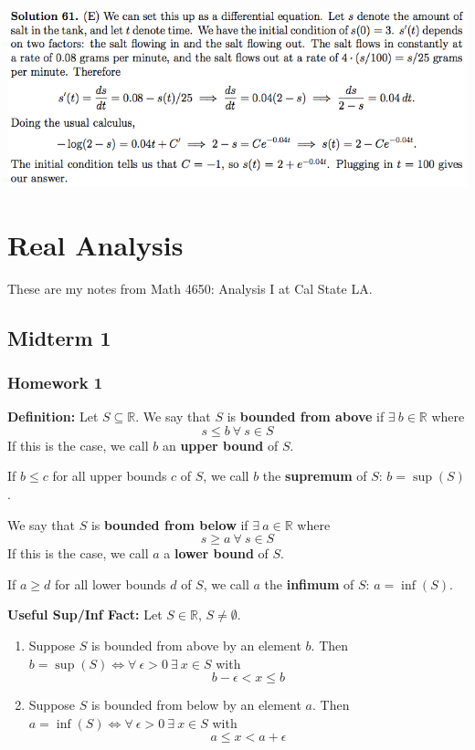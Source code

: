 \documentclass{article}
\begin{document}
\includegraphics[scale=0.65]{1268_61s}

\pagebreak

\section{Real Analysis}

These are my notes from Math 4650: Analysis I at Cal State LA.


\subsection{Midterm 1}

\subsubsection{Homework 1}

\textbf{Definition:} Let \(S \subseteq \mathbb{R}\). We say that \(S\) is \textbf{bounded from above} if \(\exists \ b \in \mathbb{R}\) where \[s \leq b \ \forall \ s \in S\]If this is the case, we call \(b\) an \textbf{upper bound} of \(S\).

If \(b \leq c \) for all upper bounds \(c\) of \(S\), we call \(b\) the \textbf{supremum} of \(S\): \(b = \sup(S)\).

We say that \(S\) is \textbf{bounded from below} if \(\exists \ a \in \mathbb{R}\) where \[s \geq a \ \forall \ s \in S\]If this is the case, we call \(a\) a \textbf{lower bound} of \(S\).

If \(a \geq d \) for all lower bounds \(d\) of \(S\), we call \(a\) the \textbf{infimum} of \(S\): \(a = \inf(S)\).

\textbf{Useful Sup/Inf Fact:} Let \(S \in \mathbb{R}\), \(S \neq \emptyset\). 

\begin{enumerate}[(1)]

\item Suppose \(S\) is bounded from above by an element \(b\). Then \(b = \sup(S) \iff \forall \ \epsilon >0 \ \exists \ x \in S\) with \[b - \epsilon < x \leq b\]

\item Suppose \(S\) is bounded from below by an element \(a\). Then \(a = \inf(S) \iff \forall \ \epsilon >0 \ \exists \ x \in S\) with \[a \leq x < a + \epsilon\]

\end{enumerate}
\end{document}
